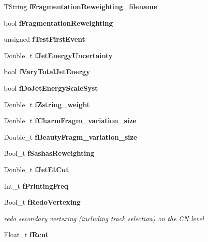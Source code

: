 \begin{CompactItemize}
\item 
TString \textbf{f\-Fragmentation\-Reweighting\_\-filename}\label{classTMiniNtupleAnalyzer_6e542be9d424791b1d8f93def6a0d1ab}

\item 
bool \textbf{f\-Fragmentation\-Reweighting}\label{classTMiniNtupleAnalyzer_158ba453394546d21ee11acf23dcc8f2}

\item 
unsigned \textbf{f\-Test\-First\-Event}\label{classTMiniNtupleAnalyzer_0faf703ce06c4057304e5beacf762144}

\item 
Double\_\-t \textbf{f\-Jet\-Energy\-Uncertainty}\label{classTMiniNtupleAnalyzer_6a2598b23f4bb4b704741fa5596359dd}

\item 
bool \textbf{f\-Vary\-Total\-Jet\-Energy}\label{classTMiniNtupleAnalyzer_9c852570c432f662cfb7399e1771fdaa}

\item 
bool \textbf{f\-Do\-Jet\-Energy\-Scale\-Syst}\label{classTMiniNtupleAnalyzer_2e328562364b737ae244a6eb6e0fc64e}

\item 
Double\_\-t \textbf{f\-Zstring\_\-weight}\label{classTMiniNtupleAnalyzer_fb1fac10110a18a450c5c4cb08c17250}

\item 
Double\_\-t \textbf{f\-Charm\-Fragm\_\-variation\_\-size}\label{classTMiniNtupleAnalyzer_b031b35499cbe98b211b1c26cc6ea7a3}

\item 
Double\_\-t \textbf{f\-Beauty\-Fragm\_\-variation\_\-size}\label{classTMiniNtupleAnalyzer_b9a5c977389baba4f9d6530a92191703}

\item 
Bool\_\-t \textbf{f\-Sashas\-Reweighting}\label{classTMiniNtupleAnalyzer_371adf0ee3036de1cee6e26680cb51c8}

\item 
Double\_\-t \textbf{f\-Jet\-Et\-Cut}\label{classTMiniNtupleAnalyzer_b02d3cdae79641d27837cbf7f873610b}

\item 
Int\_\-t \textbf{f\-Printing\-Freq}\label{classTMiniNtupleAnalyzer_abf29c3a66d01e502fe9309b689a746a}

\item 
Bool\_\-t \bf{f\-Redo\-Vertexing}\label{classTMiniNtupleAnalyzer_cb7a2e8894285eda92d069480d80a58b}

\begin{CompactList}\small\item\em redo secondary vertexing (including track selection) on the CN level \item\end{CompactList}\item 
Float\_\-t \bf{f\-Rcut}\label{classTMiniNtupleAnalyzer_c464056b6252849618ac0de519f0cf73}


\end{CompactItemize}
